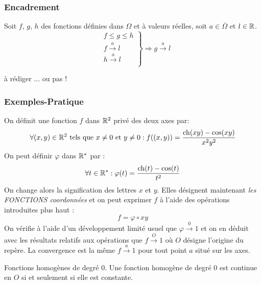 \subsubsection{Encadrement}
\begin{prop}
 Soit $f$, $g$, $h$ des fonctions définies dans $\Omega$ et à valeurs réelles, soit $a\in \overline{\Omega}$ et $l\in \mathbb{R}$.
\begin{displaymath}
 \left. 
\begin{aligned}
 &f\leq g \leq h\\
 &f\xrightarrow{a}l\\
 &h\xrightarrow{a}l\\
\end{aligned}
\right\rbrace 
\Rightarrow g\xrightarrow{a}l
\end{displaymath}
\end{prop}
\begin{demo}
 à rédiger ... ou pas !
\end{demo}

\subsubsection{Exemples-Pratique}

On définit une fonction $f$ dans $\mathbb{R}^2$ privé des deux axes par:
\begin{displaymath}
 \forall (x,y)\in \mathbb{R}^2\text{ tels que } x\neq 0 \text{ et } y\neq 0 :
f((x,y))=\frac{\mathop{\mathrm{ch}}(xy)-\cos(xy)}{x^2y^2}
\end{displaymath}
On peut définir $\varphi$ dans $\mathbb{R}^*$ par :
\begin{displaymath}
 \forall t\in \mathbb{R}^* : \varphi(t)=\frac{\mathop{\mathrm{ch}}(t)-\cos(t)}{t^2}
\end{displaymath}
On change alors la signification des lettres $x$ et $y$. Elles désignent maintenant \emph{les FONCTIONS coordonnées} et on peut exprimer $f$ à l'aide des opérations introduites plus haut :
\begin{displaymath}
 f = \varphi \circ xy
\end{displaymath}
On vérifie à l'aide d'un développement limité usuel que $\varphi\xrightarrow{0}1$ et on en déduit avec les résultats relatifs aux opérations que $f\xrightarrow{O}1$ où $O$ désigne l'origine du repère. La convergence est la même $f\xrightarrow{a}1$ pour tout point $a$ situé sur les axes.

Fonctions homogènes de degré $0$.
Une fonction homogène de degré $0$ est continue en $O$ si et seulement si elle est constante.
